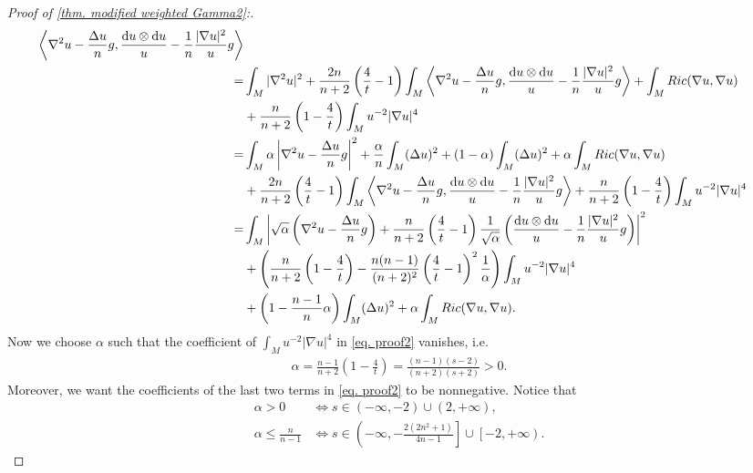 \documentclass[10pt,a4paper]{amsart}
\newcommand{\dd}{\mathop{}\!\mathrm{d}}%
\begin{document}
\begin{proof}[Proof of \cref{thm. modified weighted Gamma2}:]
\begin{align}
     \left\langle\nabla^2 u-\frac{\Delta u}{n}g,\frac{\dd u\otimes \dd u}{u}-\frac{1}{n}\frac{|\nabla u|^2}{u}g\right\rangle
     \notag\\
     =&\int_M |\nabla^2 u|^2
     +\frac{2n}{n+2}\left(\frac{4}{t}-1\right)\int_M
     \left\langle\nabla^2 u-\frac{\Delta u}{n}g,\frac{\dd u\otimes \dd u}{u}-\frac{1}{n}\frac{|\nabla u|^2}{u}g\right\rangle
     +\int_M Ric(\nabla u,\nabla u)
     \notag\\
     &+\frac{n}{n+2}\left(1-\frac{4}{t}\right)\int_M
     u^{-2}|\nabla u|^4
     \notag\\
     =&\int_M \alpha\left|\nabla^2 u-\frac{\Delta u}{n}g\right|^2
     +\frac{\alpha}{n}\int_M
     (\Delta u)^2
     +(1-\alpha)\int_M
     (\Delta u)^2
     +\alpha \int_M Ric(\nabla u,\nabla u)\notag\\
     &+\frac{2n}{n+2}\left(\frac{4}{t}-1\right)\int_M
     \left\langle\nabla^2 u-\frac{\Delta u}{n}g,\frac{\dd u\otimes \dd u}{u}-\frac{1}{n}\frac{|\nabla u|^2}{u}g\right\rangle
     +\frac{n}{n+2}\left(1-\frac{4}{t}\right)
     \int_M u^{-2}|\nabla u|^4\notag\\
     =&\int_M \left|\sqrt{\alpha}
     \left(\nabla^2 u-\frac{\Delta u}{n}g\right)
     +\frac{n}{n+2}\left(\frac{4}{t}-1\right)\frac{1}{\sqrt{\alpha}}
     \left(\frac{\dd u\otimes \dd u}{u}-\frac{1}{n}\frac{|\nabla u|^2}{u}g\right)\right|^2
     \notag\\
     &+\left(
     \frac{n}{n+2}\left(1-\frac{4}{t}\right)
     -\frac{n(n-1)}{(n+2)^2}\left(\frac{4}{t}-1\right)^2\frac{1}{\alpha}
     \right)
     \int_M u^{-2}|\nabla u|^4\notag
     \\
     &+\left(1-\frac{n-1}{n}\alpha\right)
     \int_M (\Delta u)^2
     +\alpha \int_M Ric(\nabla u,\nabla u).\label{eq. proof2}
 \end{align}
 Now we choose $\alpha$ such that the coefficient of $\int_M u^{-2}|\nabla u|^4$ in \cref{eq. proof2} vanishes, i.e.
 \begin{align*}
     \alpha=\frac{n-1}{n+2}\left(1-\frac{4}{t}\right)
     =\frac{(n-1)(s-2)}{(n+2)(s+2)}>0.
 \end{align*}
 Moreover, we want  the coefficients of the last two terms in \cref{eq. proof2} to be nonnegative. Notice that
 \begin{align*}
     \alpha>0&\Longleftrightarrow
     s\in (-\infty,-2)\cup \left(2,+\infty\right),\\
     \alpha\leq \frac{n}{n-1}
     &\Longleftrightarrow
     s\in\left(-\infty,-\frac{2(2n^2+1)}{4n-1}\right]\cup
     \left[-2,+\infty\right).

\end{align*}
\end{proof}
\end{document}
